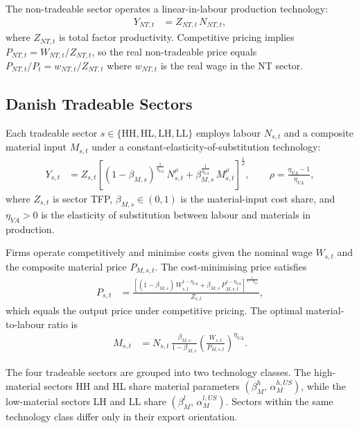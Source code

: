 \documentclass[12pt,a4paper]{article}
\begin{document}
The non-tradeable sector operates a linear-in-labour production technology:
\begin{align}
    Y_{NT,t} &= Z_{NT,t}\,N_{NT,t},
    \label{eq:YNT}
\end{align}
where $Z_{NT,t}$ is total factor productivity. Competitive pricing implies $P_{NT,t} = W_{NT,t}/Z_{NT,t}$, so the real non-tradeable price equals $P_{NT,t}/P_t = w_{NT,t}/Z_{NT,t}$ where $w_{NT,t}$ is the real wage in the NT sector.

\subsection{Danish Tradeable Sectors}

Each tradeable sector $s \in \{\text{HH},\text{HL},\text{LH},\text{LL}\}$ employs labour $N_{s,t}$ and a composite material input $M_{s,t}$ under a constant-elasticity-of-substitution technology:
\begin{align}
    Y_{s,t} &= Z_{s,t}\left[
        (1-\beta_{M,s})^{\frac{1}{\eta_{VA}}}\,N_{s,t}^\rho
        + \beta_{M,s}^{\frac{1}{\eta_{VA}}}\,M_{s,t}^\rho
    \right]^{\!\frac{1}{\rho}},
    \qquad \rho = \frac{\eta_{VA}-1}{\eta_{VA}},
    \label{eq:Ys}
\end{align}
where $Z_{s,t}$ is sector TFP, $\beta_{M,s} \in (0,1)$ is the material-input cost share, and $\eta_{VA} > 0$ is the elasticity of substitution between labour and materials in production.

Firms operate competitively and minimise costs given the nominal wage $W_{s,t}$ and the composite material price $P_{M,s,t}$. The cost-minimising price satisfies
\begin{align}
    P_{s,t} &= \frac{\left[
        (1-\beta_{M,s})\,W_{s,t}^{1-\eta_{VA}}
        + \beta_{M,s}\,P_{M,s,t}^{1-\eta_{VA}}
    \right]^{\!\frac{1}{1-\eta_{VA}}}}{Z_{s,t}},
    \label{eq:Ps}
\end{align}
which equals the output price under competitive pricing. The optimal material-to-labour ratio is
\begin{align}
    M_{s,t} &= N_{s,t}\,\frac{\beta_{M,s}}{1-\beta_{M,s}}
        \left(\frac{W_{s,t}}{P_{M,s,t}}\right)^{\!\eta_{VA}}.
    \label{eq:material_demand}
\end{align}

The four tradeable sectors are grouped into two technology classes. The high-material sectors HH and HL share material parameters $(\beta^h_M,\, \alpha^{h,US}_M)$, while the low-material sectors LH and LL share $(\beta^l_M,\, \alpha^{l,US}_M)$. Sectors within the same technology class differ only in their export orientation.
\end{document}
